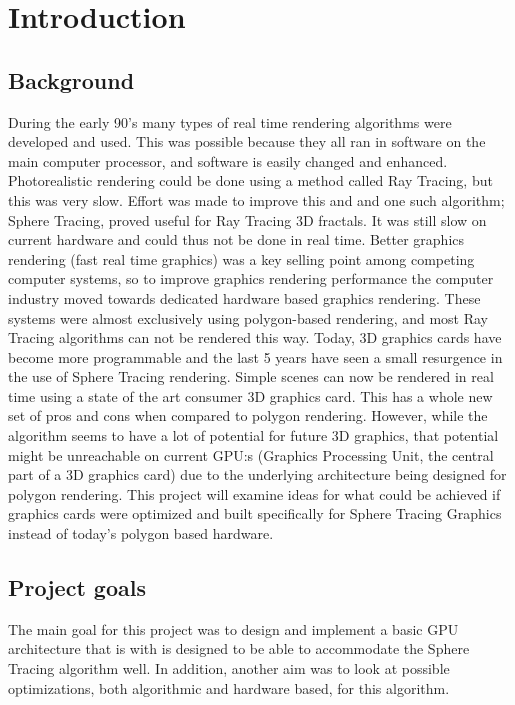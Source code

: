 \chapter{Introduction} 
	
	\section{Background}
		During the early 90’s many types of real time rendering algorithms were 
		developed and used. This was possible because they all ran in software 
		on the main computer processor, and software is easily changed and 
		enhanced. Photorealistic rendering could be done using a method called 
		Ray Tracing, but this was very slow. Effort was made to improve this and 
		and one such algorithm; Sphere Tracing,  proved useful for Ray Tracing 
		3D fractals. It was still slow on current hardware and could 
		thus not be done in real time. Better graphics rendering
		(fast real time graphics) was a key selling point among competing 
		computer systems, so to improve graphics rendering performance the 
		computer industry moved towards dedicated hardware based graphics 
		rendering. These systems were almost exclusively using polygon-based 
		rendering, and most Ray Tracing algorithms can not be rendered this 
		way. Today, 3D graphics cards have become more programmable and the 
		last 5 years have seen a small resurgence in the use of Sphere Tracing
		rendering. Simple scenes can now be rendered in real time using a state 
		of the art consumer 3D graphics card. This has a whole new set of pros 
		and cons when compared to polygon rendering. However, while 
		the algorithm seems to have a lot of potential for future 3D graphics, 
		that potential might be unreachable on current GPU:s 
		(Graphics Processing Unit, the central part of a 3D graphics card) due 
		to the underlying architecture being designed for polygon rendering. 
		This project will examine ideas for what could be achieved if graphics 
		cards were optimized and built specifically for Sphere Tracing Graphics
		instead of today’s polygon based hardware.
		 
	
	\section{Project goals}
		
		The main goal for this project was to design and implement a basic GPU 
		architecture that is with is designed to be able to accommodate the Sphere 
		Tracing algorithm well. In addition, another aim was to look at possible 
		optimizations, both algorithmic	and hardware based, for this algorithm.
		
